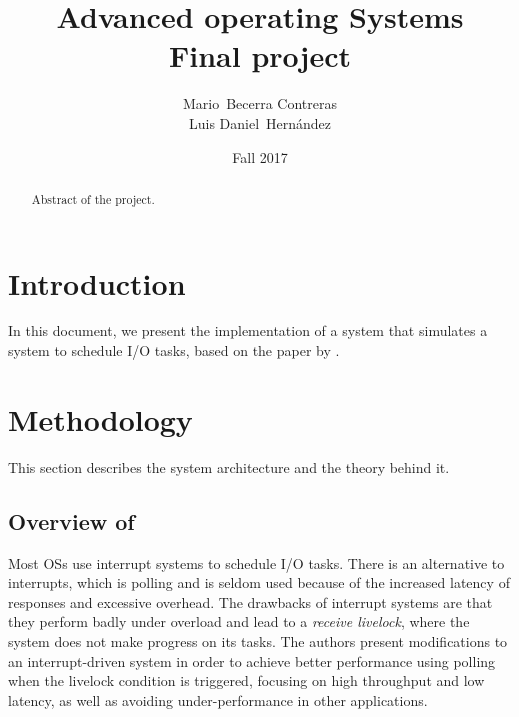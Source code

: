 \documentclass{article}
\begin{document}

\title{Advanced operating Systems \\ Final project}

\author{Mario~Becerra Contreras \\ Luis Daniel~Hernández}

\date{Fall 2017}


\maketitle

\begin{abstract}

Abstract of the project.

\end{abstract}

\section{Introduction}

In this document, we present the implementation of a system that simulates a system to schedule I/O tasks, based on the paper by \citeauthor{mogul1997eliminating} \cite{mogul1997eliminating}.


\section{Methodology}

This section describes the system architecture and the theory behind it.

\subsection{Overview of }

Most OSs use interrupt systems to schedule I/O tasks. There is an alternative to interrupts, which is polling and is seldom used because of the increased latency of responses and excessive overhead. The drawbacks of interrupt systems are that they perform badly under overload and lead to a \textit{receive livelock}, where the system does not make progress on its tasks. The authors present modifications to an interrupt-driven system in order to achieve better performance using polling when the livelock condition is triggered, focusing on high throughput and low latency, as well as avoiding under-performance in other applications.
\end{document}
